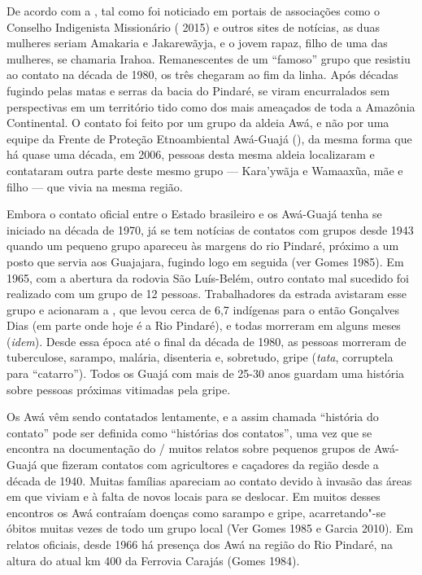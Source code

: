 De acordo com a , tal como foi noticiado em portais de associações
como o Conselho Indigenista Missionário ( 2015) e outros sites de
notícias, as duas mulheres seriam Amakaria e Jakarewãyja, e o jovem
rapaz, filho de uma das mulheres, se chamaria Irahoa. Remanescentes de
um ``famoso'' grupo que resistiu ao contato na década de 1980, os três
chegaram ao fim da linha. Após décadas fugindo pelas matas e serras da
bacia do Pindaré, se viram encurralados sem perspectivas em um
território tido como dos mais ameaçados de toda a Amazônia Continental.
O contato foi feito por um grupo da aldeia Awá, e não por uma equipe da
Frente de Proteção Etnoambiental Awá-Guajá (), da mesma forma que
há quase uma década, em 2006, pessoas desta mesma aldeia localizaram e
contataram outra parte deste mesmo grupo --- Kara'ywãja e Wamaaxũa, mãe e
filho --- que vivia na mesma região.

Embora o contato oficial entre o Estado brasileiro e os Awá-Guajá tenha
se iniciado na década de 1970, já se tem notícias de contatos com grupos
desde 1943 quando um pequeno grupo apareceu às margens do rio Pindaré,
próximo a um posto que servia aos Guajajara, fugindo logo em seguida
(ver Gomes 1985). Em 1965, com a abertura da rodovia São Luís-Belém,
outro contato mal sucedido foi realizado com um grupo de 12 pessoas.
Trabalhadores da estrada avistaram esse grupo e acionaram a , que
levou cerca de 6,7 indígenas para o então  Gonçalves Dias (em parte
onde hoje é a  Rio Pindaré), e todas morreram em alguns meses (\emph{idem}).
Desde essa época até o final da década de 1980, as pessoas morreram de
tuberculose, sarampo, malária, disenteria e, sobretudo, gripe
(\emph{tata}, corruptela para ``catarro''). Todos os Guajá com mais de
25-30 anos guardam uma história sobre pessoas próximas vitimadas pela
gripe.

Os Awá vêm sendo contatados lentamente, e a assim chamada ``história do
contato'' pode ser definida como ``histórias dos contatos'', uma vez que
se encontra na documentação do / muitos relatos sobre pequenos
grupos de Awá-Guajá que fizeram contatos com agricultores e caçadores da
região desde a década de 1940. Muitas famílias apareciam ao contato
devido à invasão das áreas em que viviam e à falta de novos locais para
se deslocar. Em muitos desses encontros os Awá contraíam doenças como
sarampo e gripe, acarretando"-se óbitos muitas vezes de todo um grupo
local (Ver Gomes 1985 e Garcia 2010). Em relatos oficiais, desde 1966 há
presença dos Awá na região do Rio Pindaré, na altura do atual km 400 da
Ferrovia Carajás (Gomes 1984).


